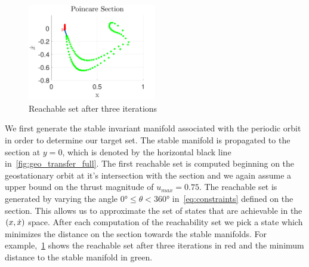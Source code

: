 \documentclass[preprint]{elsarticle}
\begin{document}
\begin{figure}[htbp]
   \centering
   \includegraphics[width=0.5\textwidth]{third_reachability_set} %
   \caption{Reachable set after three iterations}
   \label{fig:third_reachability_set}
\end{figure}
We first generate the stable invariant manifold associated with the periodic orbit in order to determine our target set.
The stable manifold is propagated to the \Poincare section at \( y = 0 \), which is denoted by the horizontal black line in~\cref{fig:geo_transfer_full}.
The first reachable set is computed beginning on the geostationary orbit at it's intersection with the \Poincare section and we again assume a upper bound on the thrust magnitude of \( u_{max} = 0.75 \).
The reachable set is generated by varying the angle \( \ang{0} \leq \theta < \ang{360} \) in~\cref{eq:constraints} defined on the \Poincare section.
This allows us to approximate the set of states that are achievable in the \( \left( x ,\dot{x} \right) \) space.
After each computation of the reachability set we pick a state which minimizes the distance on the \Poincare section towards the stable manifolds.
For example,~\cref{fig:third_reachability_set} shows the reachable set after three iterations in red and the minimum distance to the stable manifold in green.
\end{document}
